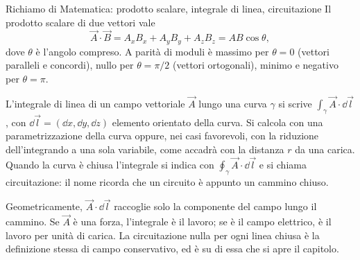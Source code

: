 \documentclass[main.tex]{subfiles}
\begin{document}
	\begin{riquadro}{Richiamo di Matematica: prodotto scalare, integrale di linea, circuitazione}
		Il prodotto scalare di due vettori vale
		\[
		\vec A\cdot\vec B=A_xB_x+A_yB_y+A_zB_z=AB\cos\theta ,
		\]
		dove $\theta$ è l'angolo compreso. A parità di moduli è massimo per $\theta=0$ (vettori paralleli e concordi), nullo per $\theta=\pi/2$ (vettori ortogonali), minimo e negativo per $\theta=\pi$.
		
		L'integrale di linea di un campo vettoriale $\vec A$ lungo una curva $\gamma$ si scrive $\int_\gamma\vec A\cdot\dd\vec l$, con $\dd\vec l=(\dd x,\dd y,\dd z)$ elemento orientato della curva. Si calcola con una parametrizzazione della curva oppure, nei casi favorevoli, con la riduzione dell'integrando a una sola variabile, come accadrà con la distanza $r$ da una carica. Quando la curva è chiusa l'integrale si indica con $\oint_\gamma\vec A\cdot\dd\vec l$ e si chiama circuitazione: il nome ricorda che un circuito è appunto un cammino chiuso.
		
		Geometricamente, $\vec A\cdot\dd\vec l$ raccoglie solo la componente del campo lungo il cammino. Se $\vec A$ è una forza, l'integrale è il lavoro; se è il campo elettrico, è il lavoro per unità di carica. La circuitazione nulla per ogni linea chiusa è la definizione stessa di campo conservativo, ed è su di essa che si apre il capitolo.
	\end{riquadro}
	
\end{document}
